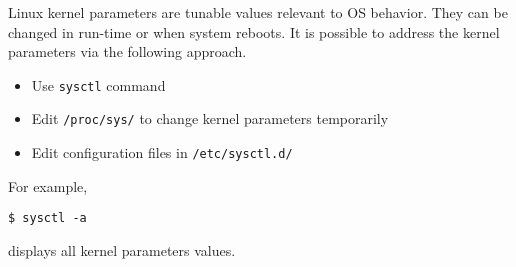 Linux kernel parameters are tunable values relevant to OS behavior. They can be changed in run-time or when system reboots. It is possible to address the kernel parameters via the following approach.
\begin{itemize}
	\item Use \verb|sysctl| command
	\item Edit \verb|/proc/sys/| to change kernel parameters temporarily
	\item Edit configuration files in \verb|/etc/sysctl.d/|
\end{itemize}
For example,
\begin{lstlisting}
$ sysctl -a
\end{lstlisting}
displays all kernel parameters values.








